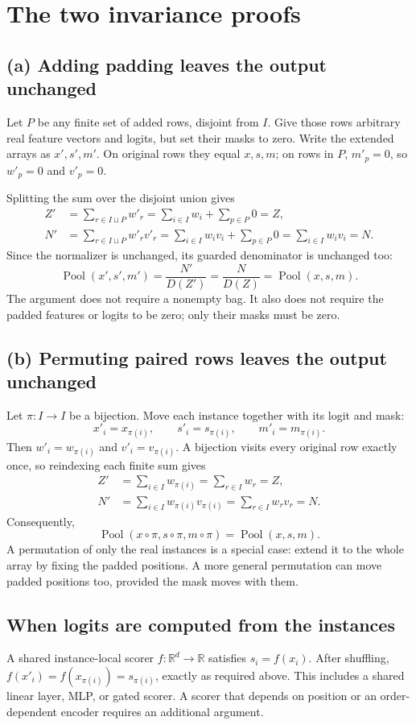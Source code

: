 \documentclass[11pt]{article}
\newcommand{\Pool}{\operatorname{Pool}}
\newcommand{\result}[1]{\boxed{#1}}
\begin{document}
\newpage
\section{The two invariance proofs}
\subsection*{(a) Adding padding leaves the output unchanged}
Let $P$ be any finite set of added rows, disjoint from $I$. Give those rows
arbitrary real feature vectors and logits, but set their masks to zero.
Write the extended arrays as $x',s',m'$. On original rows they equal $x,s,m$;
on rows in $P$, $m'_p=0$, so $w'_p=0$ and $v'_p=0$.

Splitting the sum over the disjoint union gives
\begin{align*}
 Z'&=\sum_{r\in I\sqcup P}w'_r
     =\sum_{i\in I}w_i+\sum_{p\in P}0=Z,\\
 N'&=\sum_{r\in I\sqcup P}w'_r v'_r
     =\sum_{i\in I}w_i v_i+\sum_{p\in P}0
     =\sum_{i\in I}w_i v_i=N.
\end{align*}
Since the normalizer is unchanged, its guarded denominator is unchanged too:
\[
 \result{\Pool(x',s',m')=\frac{N'}{D(Z')}=
 \frac{N}{D(Z)}=\Pool(x,s,m).}
\]
The argument does not require a nonempty bag. It also does not require the
padded features or logits to be zero; only their masks must be zero.

\subsection*{(b) Permuting paired rows leaves the output unchanged}
Let $\pi:I\to I$ be a bijection. Move each instance together with its logit
and mask:
\[
 x'_i=x_{\pi(i)},\qquad s'_i=s_{\pi(i)},\qquad m'_i=m_{\pi(i)}.
\]
Then $w'_i=w_{\pi(i)}$ and $v'_i=v_{\pi(i)}$. A bijection visits every
original row exactly once, so reindexing each finite sum gives
\begin{align*}
 Z'&=\sum_{i\in I}w_{\pi(i)}=\sum_{r\in I}w_r=Z,\\
 N'&=\sum_{i\in I}w_{\pi(i)}v_{\pi(i)}
     =\sum_{r\in I}w_r v_r=N.
\end{align*}
Consequently,
\[
 \result{\Pool(x\circ\pi,s\circ\pi,m\circ\pi)=\Pool(x,s,m).}
\]
A permutation of only the real instances is a special case: extend it to the
whole array by fixing the padded positions. A more general permutation can
move padded positions too, provided the mask moves with them.

\subsection*{When logits are computed from the instances}
A shared instance-local scorer $f:\mathbb R^d\to\mathbb R$ satisfies
$s_i=f(x_i)$. After shuffling, $f(x'_i)=f(x_{\pi(i)})=s_{\pi(i)}$, exactly
as required above. This includes a shared linear layer, MLP, or gated scorer.
A scorer that depends on position or an order-dependent encoder requires
an additional argument.
\end{document}

